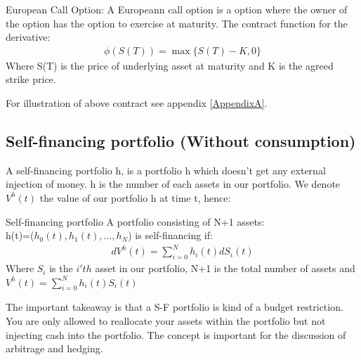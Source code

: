 \theoremstyle{definition}
\begin{definition}{European Call Option:}\label{ECall}
A Europeann call option is a option where the owner of the option has the option to exercise at maturity. The contract function for the derivative:
\begin{equation}
\begin{split}
\phi(S(T))=\max\{S(T)-K, 0\}
\end{split}
\end{equation}
Where S(T) is the price of underlying asset at maturity and K is the agreed strike price.
\end{definition}
For illustration of above contract see appendix \ref{AppendixA}.

\parencite{finKont}



\subsection{Self-financing portfolio (Without consumption)}
A self-financing portfolio h, is a portfolio h which doesn't get any external injection of money. h is the number of each assets in our portfolio. We denote $V^{h}(t)$ the value of our portfolio h at time t, hence:
\theoremstyle{definition}
\begin{definition}{Self-financing portfolio}
A portfolio consisting of N+1 assets: \\
h(t)=($h_0(t),h_1(t), \dotsc, h_{N}$) is self-financing if:
\begin{equation}\label{SF}
\begin{split}
dV^{h}(t)=\sum_{i=0}^{N} h_{i}(t) dS_{i}(t)
\end{split}
\end{equation}
Where $S_{i}$ is the $i'th$ asset in our portfolio, N+1 is the total number of assets and\\
$V^{h}(t)=\sum_{i=0}^{N} h_{i}(t) S_{i}(t)$
\end{definition}
The important takeaway is that a S-F portfolio is kind of a budget restriction. You are only allowed to reallocate your assets within the portfolio but not injecting cash into the portfolio. The concept is important for the discussion of arbitrage and hedging.

